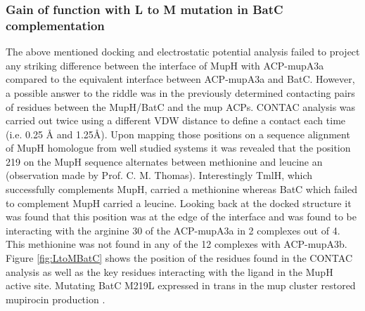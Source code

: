		\subsubsection{Gain of function with L to M mutation in BatC complementation }
		\label{sec:LtoMBatC}
		The above mentioned docking and electrostatic potential analysis failed to project any striking difference between the interface of MupH with ACP-mupA3a compared to the equivalent interface between ACP-mupA3a and BatC. However, a possible answer to the riddle was in the previously determined contacting pairs of residues between the MupH/BatC and the mup ACPs. CONTAC analysis was carried out twice using a different VDW distance to define a contact each time (i.e. 0.25 \AA{} and 1.25\AA{}). Upon mapping those positions on a sequence alignment of MupH homologue from well studied systems it was revealed that the position 219 on the MupH sequence alternates between methionine and leucine an (observation made by Prof. C. M. Thomas). Interestingly TmlH, which successfully complements MupH, carried a methionine whereas BatC which failed to complement MupH carried a leucine. Looking back at the docked structure it was found that this position was at the edge of the interface and was found to be interacting with the arginine 30 of the ACP-mupA3a in 2 complexes out of 4. This methionine was not found in any of the 12 complexes with ACP-mupA3b. Figure \ref{fig:LtoMBatC} shows the position of the residues found in the CONTAC analysis as well as the key residues interacting with the ligand in the MupH active site. Mutating BatC M219L expressed in trans in the mup cluster restored mupirocin production \parencite{Haines2013}. 
		
